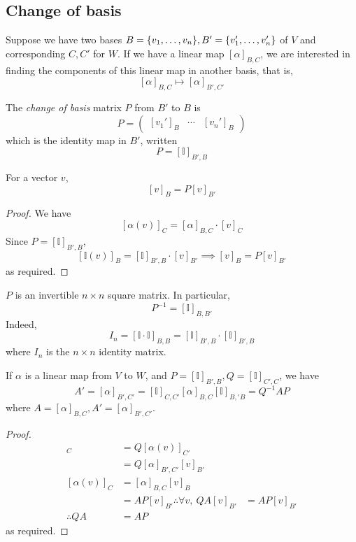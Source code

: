 \subsection{Change of basis}
Suppose we have two bases \( B = \qty{v_1, \dots, v_n}, B' = \qty{v_1', \dots, v_n'} \) of \( V \) and corresponding \( C, C' \) for \( W \).
If we have a linear map \( [\alpha]_{B,C} \), we are interested in finding the components of this linear map in another basis, that is,
\[
	[\alpha]_{B,C} \mapsto [\alpha]_{B',C'}
\]
\begin{definition}
	The \textit{change of basis} matrix \( P \) from \( B' \) to \( B \) is
	\[
		P = \begin{pmatrix}
			[v_1']_B & \cdots & [v_n']_B
		\end{pmatrix}
	\]
	which is the identity map in \( B' \), written
	\[
		P = [\mathbb I]_{B', B}
	\]
\end{definition}
\begin{lemma}
	For a vector \( v \),
	\[
		[v]_B = P [v]_{B'}
	\]
\end{lemma}
\begin{proof}
	We have
	\[
		[\alpha(v)]_C = [\alpha]_{B,C} \cdot [v]_C
	\]
	Since \( P = [\mathbb I]_{B', B} \),
	\[
		[\mathbb I(v)]_B = [\mathbb I]_{B', B} \cdot [v]_{B'} \implies [v]_B = P[v]_{B'}
	\]
	as required.
\end{proof}
\begin{remark}
	\( P \) is an invertible \( n \times n \) square matrix.
	In particular,
	\[
		P^{-1} = [\mathbb I]_{B,B'}
	\]
	Indeed,
	\[
		I_n = [\mathbb I \cdot \mathbb I]_{B,B} = [\mathbb I]_{B',B} \cdot [\mathbb I]_{B',B}
	\]
	where \( I_n \) is the \( n \times n \) identity matrix.
\end{remark}
\begin{proposition}
	If \( \alpha \) is a linear map from \( V \) to \( W \), and \( P = [\mathbb I]_{B',B}, Q = [\mathbb I]_{C',C} \), we have
	\[
		A' = [\alpha]_{B',C'} = [\mathbb I]_{C,C'}[\alpha]_{B,C}[\mathbb I]_{B,'B} = Q^{-1}AP
	\]
	where \( A = [\alpha]_{B,C}, A' = [\alpha]_{B',C'} \).
\end{proposition}
\begin{proof}
	\begin{align*}
		[\alpha(v)]_C                     & = Q [\alpha(v)]_{C'}          \\
		                                  & = Q [\alpha]_{B',C'} [v]_{B'} \\
		[\alpha(v)]_C                     & = [\alpha]_{B,C} [v]_B        \\
		                                  & = AP[v]_{B'}
		\therefore \forall v,\ QA[v]_{B'} & = AP[v]_{B'}                  \\
		\therefore QA                     & = AP
	\end{align*}
	as required.
\end{proof}

